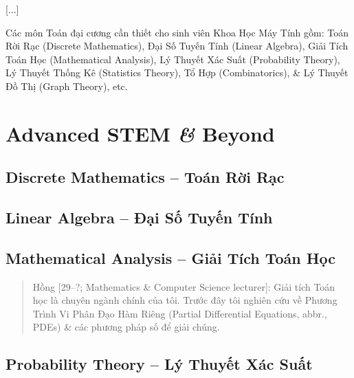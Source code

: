\documentclass[12pt,twoside]{book}
\begin{document}
[...]

Các môn Toán đại cương cần thiết cho sinh viên Khoa Học Máy Tính gồm: Toán Rời Rạc (Discrete Mathematics), Đại Số Tuyến Tính (Linear Algebra), Giải Tích Toán Học (Mathematical Analysis), Lý Thuyết Xác Suất (Probability Theory), Lý Thuyết Thống Kê (Statistics Theory), Tổ Hợp (Combinatorics), \& Lý Thuyết Đồ Thị (Graph Theory), etc.


\section{Advanced STEM {\it\&} Beyond}

\subsection{Discrete Mathematics -- Toán Rời Rạc}


\subsection{Linear Algebra -- Đại Số Tuyến Tính}


\subsection{Mathematical Analysis -- Giải Tích Toán Học}

\begin{quote}
	{\sf Hồng [29--?; Mathematics \& Computer Science lecturer]}: Giải tích Toán học là chuyên ngành chính của tôi. Trước đây tôi nghiên cứu về Phương Trình Vi Phân Đạo Hàm Riêng (Partial Differential Equations, abbr., PDEs) \& các phương pháp số để giải chúng.
\end{quote}


\subsection{Probability Theory -- Lý Thuyết Xác Suất}

\end{document}

